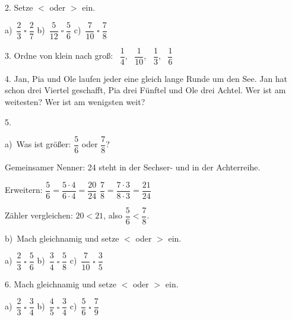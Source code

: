 \documentclass[11pt]{article}
\newcommand{\grau}[1]{{\color{mbgrau}#1}}
\begin{document}
\begin{pfaufg}{}{2.}{}
Setze $<$ oder $>$ ein. \par\vspace{3pt} a)~$\dfrac{2}{3} \;\square\; \dfrac{2}{7}$ \qquad b)~$\dfrac{5}{12} \;\square\; \dfrac{5}{6}$ \qquad c)~$\dfrac{7}{10} \;\square\; \dfrac{7}{8}$
\end{pfaufg}

\begin{pfaufg}{}{3.}{}
Ordne von klein nach groß: \ $\dfrac{1}{4}$, \ $\dfrac{1}{10}$, \ $\dfrac{1}{3}$, \ $\dfrac{1}{6}$
\end{pfaufg}

\begin{pfaufg}{}{4.}{}
Jan, Pia und Ole laufen jeder eine gleich lange Runde um den See. Jan hat schon drei Viertel geschafft, Pia drei Fünftel und Ole drei Achtel. Wer ist am weitesten? Wer ist am wenigsten weit?
\end{pfaufg}

\begin{pfaufg}{}{5.}{}
\grau{a)\ Was ist größer: $\dfrac{5}{6}$ oder $\dfrac{7}{8}$?\par\smallskip Gemeinsamer Nenner: 24 steht in der Sechser- und in der Achterreihe.\par Erweitern: $\dfrac{5}{6} = \dfrac{5 \cdot 4}{6 \cdot 4} = \dfrac{20}{24}$ \quad $\dfrac{7}{8} = \dfrac{7 \cdot 3}{8 \cdot 3} = \dfrac{21}{24}$\par Zähler vergleichen: $20 < 21$, also $\dfrac{5}{6} < \dfrac{7}{8}$.}
\par\medskip
b)\ Mach gleichnamig und setze $<$ oder $>$ ein. \par\vspace{3pt} a)~$\dfrac{2}{3} \;\square\; \dfrac{5}{6}$ \qquad b)~$\dfrac{3}{4} \;\square\; \dfrac{5}{8}$ \qquad c)~$\dfrac{7}{10} \;\square\; \dfrac{3}{5}$
\end{pfaufg}

\begin{pfaufg}{}{6.}{}
Mach gleichnamig und setze $<$ oder $>$ ein. \par\vspace{3pt} a)~$\dfrac{2}{3} \;\square\; \dfrac{3}{4}$ \qquad b)~$\dfrac{4}{5} \;\square\; \dfrac{3}{4}$ \qquad c)~$\dfrac{5}{6} \;\square\; \dfrac{7}{9}$
\end{pfaufg}
\end{document}
